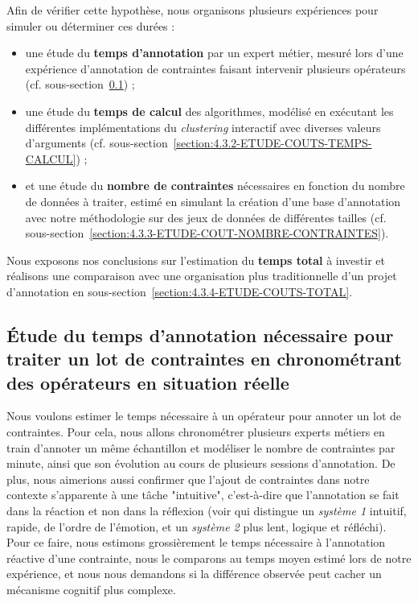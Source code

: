 	Afin de vérifier cette hypothèse, nous organisons plusieurs expériences pour simuler ou déterminer ces durées :
	\begin{itemize}
		\item une étude du \textbf{temps d'annotation} par un expert métier, mesuré lors d'une expérience d'annotation de contraintes faisant intervenir plusieurs opérateurs (cf. sous-section~\ref{section:4.3.1-ETUDE-COUTS-TEMPS-ANNOTATION}) ;
		\item une étude du \textbf{temps de calcul} des algorithmes, modélisé en exécutant les différentes implémentations du \textit{clustering} interactif avec diverses valeurs d'arguments (cf. sous-section~\ref{section:4.3.2-ETUDE-COUTS-TEMPS-CALCUL}) ;
		\item et une étude du \textbf{nombre de contraintes} nécessaires en fonction du nombre de données à traiter, estimé en simulant la création d'une base d'annotation avec notre méthodologie sur des jeux de données de différentes tailles (cf. sous-section~\ref{section:4.3.3-ETUDE-COUT-NOMBRE-CONTRAINTES}).
	\end{itemize}
	Nous exposons nos conclusions sur l'estimation du \textbf{temps total} à investir et réalisons une comparaison avec une organisation plus traditionnelle d'un projet d'annotation en sous-section~\ref{section:4.3.4-ETUDE-COUTS-TOTAL}.
	
	
	\subsection{Étude du temps d'annotation nécessaire pour traiter un lot de contraintes en chronométrant des opérateurs en situation réelle}
	\label{section:4.3.1-ETUDE-COUTS-TEMPS-ANNOTATION}
		
		Nous voulons estimer le temps nécessaire à un opérateur pour annoter un lot de contraintes.
		Pour cela, nous allons chronométrer plusieurs experts métiers en train d'annoter un même échantillon et modéliser le nombre de contraintes par minute, ainsi que son évolution au cours de plusieurs sessions d'annotation.
		De plus, nous aimerions aussi confirmer que l'ajout de contraintes dans notre contexte s'apparente à une tâche "intuitive", c'est-à-dire que l'annotation se fait dans la réaction et non dans la réflexion (voir \cite{kahneman:2011:thinking-fast-slow} qui distingue un \textit{système 1} intuitif, rapide, de l'ordre de l'émotion, et un \textit{système 2} plus lent, logique et réfléchi).
		Pour ce faire, nous estimons grossièrement le temps nécessaire à l'annotation réactive d'une contrainte, nous le comparons au temps moyen estimé lors de notre expérience, et nous nous demandons si la différence observée peut cacher un mécanisme cognitif plus complexe.
	
